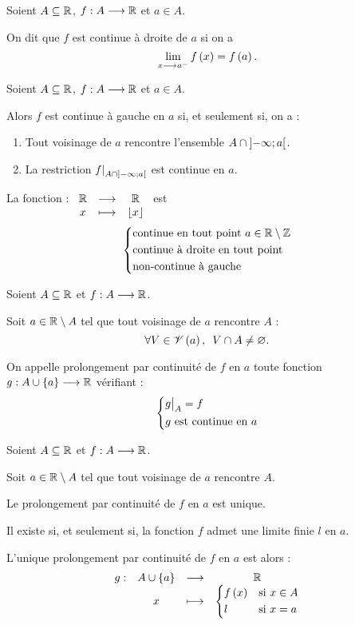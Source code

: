 \begin{defi}
Soient \(A\subseteq\mathbb{R}\), \(f:A\longrightarrow\mathbb{R}\) et \(a\in A\).

On dit que \(f\) est continue à droite de \(a\) si on a \[\lim_{x\longrightarrow a^-}f\left(x\right)=f\left(a\right).\]
\end{defi}

\begin{rem}[Reformulation]
Soient \(A\subseteq\mathbb{R}\), \(f:A\longrightarrow\mathbb{R}\) et \(a\in A\).

Alors \(f\) est continue à gauche en \(a\) si, et seulement si, on a :

\begin{enumerate}
\item Tout voisinage de \(a\) rencontre l'ensemble \(A\cap\left]-\infty;a\right[\). \\

\item La restriction \(\restr{f}{A\inter\intervee{\minf}{a}}\) est continue en \(a\).
\end{enumerate}
\end{rem}

\begin{ex}
La fonction  : \(\begin{array}[t]{ccc}\mathbb{R} & \longrightarrow & \mathbb{R} \\ x & \longmapsto & \left\lfloor x\right\rfloor\end{array}\) est \[\begin{dcases}\text{continue en tout point }a\in\mathbb{R}\setminus\mathbb{Z} \\ \text{continue à droite en tout point} \\ \text{non-continue à gauche}\end{dcases}\]
\end{ex}

\begin{defi}
Soient \(A\subseteq\mathbb{R}\) et \(f:A\longrightarrow\mathbb{R}\).

Soit \(a\in\mathbb{R}\setminus A\) tel que tout voisinage de \(a\) rencontre \(A\) : \[\quantifs{\forall V\in\V{a}}V\inter A\not=\ensvide.\]

On appelle prolongement par continuité de \(f\) en \(a\) toute fonction \(g:A\cup\left\lbrace a\right\rbrace\longrightarrow\mathbb{R}\) vérifiant : \[\begin{dcases}\restr{g}{A}=f \\ g\text{ est continue en }a\end{dcases}\]
\end{defi}

\begin{prop}
Soient \(A\subseteq\mathbb{R}\) et \(f:A\longrightarrow\mathbb{R}\).

Soit \(a\in\mathbb{R}\setminus A\) tel que tout voisinage de \(a\) rencontre \(A\).

Le prolongement par continuité de \(f\) en \(a\) est unique.

Il existe si, et seulement si, la fonction \(f\) admet une limite finie \(l\) en \(a\).

L'unique prolongement par continuité de \(f\) en \(a\) est alors : \[\begin{array}[t]{cccc}g : & A\cup\left\lbrace a\right\rbrace & \longrightarrow & \mathbb{R} \\ & x & \longmapsto & \begin{dcases}f\left(x\right) &\text{si }x\in A \\ l &\text{si }x=a\end{dcases}\end{array}\]
\end{prop}

